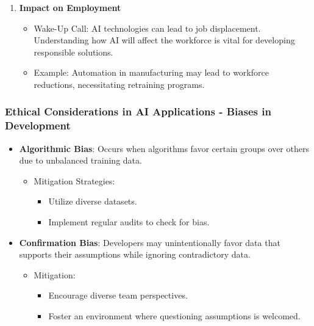 \documentclass{beamer}
\begin{document}
\begin{frame}[fragile]
\begin{enumerate}
        \item \textbf{Impact on Employment}
        \begin{itemize}
            \item Wake-Up Call: AI technologies can lead to job displacement. Understanding how AI will affect the workforce is vital for developing responsible solutions.
            \item Example: Automation in manufacturing may lead to workforce reductions, necessitating retraining programs.
        \end{itemize}
    \end{enumerate}
\end{frame}

\begin{frame}[fragile]
    \frametitle{Ethical Considerations in AI Applications - Biases in Development}
    \begin{itemize}
        \item \textbf{Algorithmic Bias}: Occurs when algorithms favor certain groups over others due to unbalanced training data.
        \begin{itemize}
            \item Mitigation Strategies:
            \begin{itemize}
                \item Utilize diverse datasets.
                \item Implement regular audits to check for bias.
            \end{itemize}
        \end{itemize}
        
        \item \textbf{Confirmation Bias}: Developers may unintentionally favor data that supports their assumptions while ignoring contradictory data.
        \begin{itemize}
            \item Mitigation:
            \begin{itemize}
                \item Encourage diverse team perspectives.
                \item Foster an environment where questioning assumptions is welcomed.
            \end{itemize}
        \end{itemize}
    \end{itemize}
\end{frame}
\end{document}
